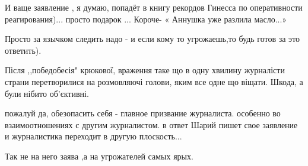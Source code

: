 \begin{itemize}
И ваще заявление , я думаю, попадёт в книгу рекордов Гинесса по оперативности
реагирования)... просто подарок ... Короче- « Аннушка уже разлила масло...»

\begin{itemize}
 
Просто за язычком следить надо - и если кому то угрожаешь,то будь готов за это ответить).
\end{itemize}

 

Після ,,победобесія" крюкової, враження таке що в одну хвилину журналісти
страни перетворилися на розмовляючі голови, яким все одне що віщати. Шкода, а
були нібито об'єктивні.


 

пожалуй да, обезопасить себя - главное призвание журналиста.  особенно во
взаимоотношениях с другим журналистом.  в ответ Шарий пишет свое заявление и
журналистика переходит в другую плоскость...

\begin{itemize}
 
Так не на него заява ,а на угрожателей самых ярых.
\end{itemize}

 


\end{itemize}
